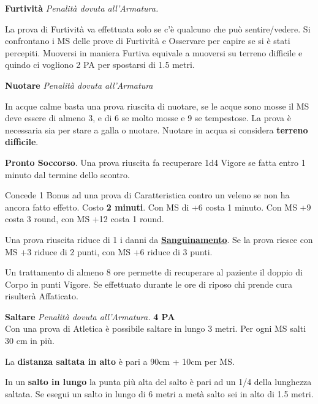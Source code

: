 \documentclass[12pt,a4paper,twoside,openany]{book}
\begin{document}
\begin{multicols}{2}
\medskip

\textbf{Furtività}  \textit{Penalità dovuta all'Armatura.}

La prova di Furtività va effettuata solo se c'è qualcuno che può sentire/vedere. Si confrontano i MS delle prove di Furtività e Osservare per capire se si è stati percepiti. Muoversi in maniera Furtiva equivale a muoversi su terreno difficile e quindo ci vogliono 2 PA per spostarsi di 1.5 metri.

\medskip

\textbf{Nuotare} \textit{Penalità dovuta all'Armatura}

In acque calme basta una prova riuscita di nuotare, se le acque sono mosse il MS deve essere di almeno 3, e di 6 se molto mosse e 9 se tempestose. La prova è necessaria sia per stare a galla o nuotare. Nuotare in acqua si considera \textbf{terreno difficile}.

\medskip

\textbf{Pronto Soccorso}\hypertarget{prontosoccorso}{}\label{prontosoccorso}. Una prova riuscita fa recuperare 1d4 Vigore se fatta entro 1 minuto dal termine dello scontro.

Concede 1 Bonus ad una prova di Caratteristica contro un veleno se non ha ancora fatto effetto. Costo \textbf{2 minuti}. Con MS di +6 costa 1 minuto. Con MS +9 costa 3 round, con MS +12 costa 1 round.

Una prova riuscita riduce di 1 i danni da \hyperlink{sanguinamento}{\textbf{Sanguinamento}}. Se la prova riesce con MS +3 riduce di 2 punti, con MS +6 riduce di 3 punti.

Un trattamento di almeno 8 ore permette di recuperare al paziente il doppio di Corpo in punti Vigore. Se effettuato durante le ore di riposo chi prende cura risulterà Affaticato.

\medskip

\textbf{Saltare} \textit{Penalità dovuta all'Armatura.} \textbf{4 PA}\\

Con una prova di Atletica è possibile saltare in lungo 3 metri. Per ogni MS salti 30 cm in più.

La \textbf{distanza saltata in alto} è pari a 90cm + 10cm per MS.

In un \textbf{salto in lungo} la punta più alta del salto è pari ad un 1/4 della lunghezza saltata. Se esegui un salto in lungo di 6 metri a metà salto sei in alto di 1.5 metri.


\end{multicols}
\end{document}
